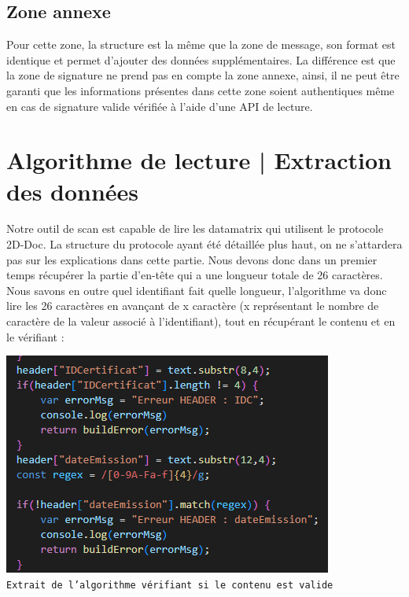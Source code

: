 \subsection{Zone annexe}

Pour cette zone, la structure est la même que la zone de message, son format est identique et permet d’ajouter des données supplémentaires. La différence est que la zone de signature ne prend pas en compte la zone annexe, ainsi, il ne peut être garanti que les informations présentes dans cette zone soient authentiques même en cas de signature valide vérifiée à l’aide d’une API de lecture.

\newpage
\section{Algorithme de lecture | Extraction des données}
Notre outil de scan est capable de lire les datamatrix qui utilisent le protocole 2D-Doc. La structure du protocole ayant été détaillée plus haut, on ne s'attardera pas sur les explications dans cette partie. Nous devons donc dans un premier temps récupérer la partie d'en-tête qui a une longueur totale de 26 caractères. Nous savons en outre quel identifiant fait quelle longueur, l'algorithme va donc lire les 26 caractères en avançant de x caractère (x représentant le nombre de caractère de la valeur associé à l'identifiant), tout en récupérant le contenu et en le vérifiant : 

\begin{center}
    \includegraphics[scale=0.50]{imgs/Capture.PNG}\\
    \texttt{Extrait de l'algorithme vérifiant si le contenu est valide}
\end{center}

